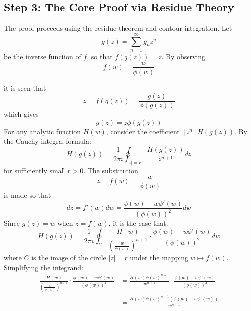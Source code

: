 \documentclass{article}
\begin{document}
\subsection{Step 3: The Core Proof via Residue Theory}

The proof proceeds using the residue theorem and contour integration. Let
\begin{equation}
  g (z) = \sum_{n = 1}^{\infty} g_n z^n
\end{equation}
be the inverse function of $f$, so that $f (g (z)) = z$. By observing
\begin{equation}
  f (w) = \frac{w}{\phi (w)}
\end{equation}


it is seen that
\begin{equation}
  z = f (g (z)) = \frac{g (z)}{\phi (g (z))}
\end{equation}
which gives
\begin{equation}
  g (z) = z \phi (g (z))
\end{equation}
For any analytic function $H (w)$, consider the coefficient $[z^n] H (g (z))$.
By the Cauchy integral formula:
\begin{equation}
  [z^n] H (g (z)) = \frac{1}{2 \pi i}  \oint_{|z| = r} \frac{H (g (z))}{z^{n +
  1}} dz
\end{equation}
for sufficiently small $r > 0$. The substitution
\begin{equation}
  z = f (w) = \frac{w}{\phi (w)}
\end{equation}
is made so that
\begin{equation}
  dz = f' (w) dw = \frac{\phi (w) - w \phi' (w)}{(\phi (w))^2} dw
\end{equation}
Since $g (z) = w$ when $z = f (w)$, it is the case that:
\begin{equation}
  [z^n] H (g (z)) = \frac{1}{2 \pi i}  \oint_C \frac{H (w)}{\left(
  \frac{w}{\phi (w)} \right)^{n + 1}} \cdot \frac{\phi (w) - w \phi'
  (w)}{(\phi (w))^2} dw
\end{equation}
where $C$ is the image of the circle $|z| = r$ under the mapping $w \mapsto f
(w)$. Simplifying the integrand:
\begin{equation}
  \begin{array}{ll}
    \frac{H (w)}{\left( \frac{w}{\phi (w)} \right)^{n + 1}} \cdot \frac{\phi
    (w) - w \phi' (w)}{(\phi (w))^2} & = \frac{H (w) \phi (w)^{n + 1}}{w^{n +
    1}} \cdot \frac{\phi (w) - w \phi' (w)}{(\phi (w))^2}\\
    & = \frac{H (w) \phi (w)^{n - 1}  (\phi (w) - w \phi' (w))}{w^{n + 1}}
  \end{array}
\end{equation}
\end{document}
